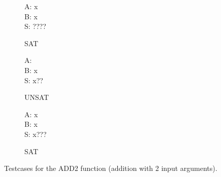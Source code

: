 \begin{figure}[p]
  \begin{center}
    \begin{subfigure}[b]{0.23\textwidth}
      \begin{diffchar}
        A: \textendash{}\textendash{}\textendash{}x \\
        B: \textendash{}\textendash{}\textendash{}x \\
        S: ????
      \end{diffchar}
      \caption{SAT}
      \label{dc:tcs-addition-5}
    \end{subfigure}
    \begin{subfigure}[b]{0.23\textwidth}
      \begin{diffchar}
        A: \textendash{}\textendash{}\textendash{}\textendash{} \\
        B: \textendash{}\textendash{}\textendash{}x \\
        S: x\textendash{}??
      \end{diffchar}
      \caption{UNSAT}
      \label{dc:tcs-addition-6}
    \end{subfigure}
    \begin{subfigure}[b]{0.23\textwidth}
      \begin{diffchar}
        A: \textendash{}\textendash{}\textendash{}x \\
        B: \textendash{}\textendash{}\textendash{}x \\
        S: x???
      \end{diffchar}
      \caption{SAT}
      \label{dc:tcs-addition-7}
    \end{subfigure}
  \end{center}
  \caption{Testcases for the ADD2 function (addition with 2 input arguments).}
  \label{dc:tcs-addition}
\end{figure}

